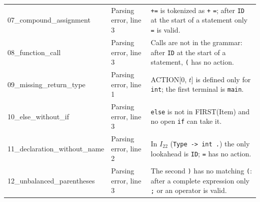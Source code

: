\documentclass[11pt,letterpaper]{article}
\newcommand{\tok}[1]{\texttt{#1}}
\begin{document}
{\begin{longtable}{@{}p{3.6cm}p{2.9cm}p{8.6cm}@{}}
07\_\allowbreak{}compound\_\allowbreak{}assignment & Parsing error, line 3 & \texttt{+=} is tokenized as \tok{+} \tok{=}; after \tok{ID} at the start of a statement only \tok{=} is valid. \\
08\_\allowbreak{}function\_\allowbreak{}call & Parsing error, line 3 & Calls are not in the grammar: after \tok{ID} at the start of a statement, \tok{(} has no action. \\
09\_\allowbreak{}missing\_\allowbreak{}return\_\allowbreak{}type & Parsing error, line 1 & ACTION[0, $t$] is defined only for \tok{int}; the first terminal is \tok{main}. \\
10\_\allowbreak{}else\_\allowbreak{}without\_\allowbreak{}if & Parsing error, line 3 & \tok{else} is not in FIRST(Item) and no open \texttt{if} can take it. \\
11\_\allowbreak{}declaration\_\allowbreak{}without\_\allowbreak{}name & Parsing error, line 2 & In $I_{22}$ (\texttt{Type -> int .}) the only lookahead is \tok{ID}; \tok{=} has no action. \\
12\_\allowbreak{}unbalanced\_\allowbreak{}parentheses & Parsing error, line 3 & The second \tok{)} has no matching \tok{(}: after a complete expression only \tok{;} or an operator is valid. \\
\bottomrule
\end{longtable}

}
\end{document}
